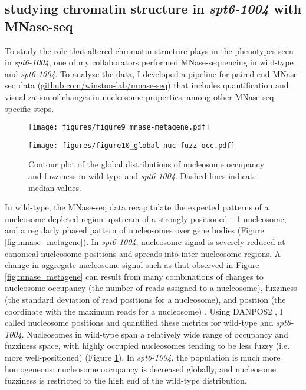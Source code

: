 \documentclass[9pt, letterpaper]{article}
\begin{document}
\subsection{studying chromatin structure in \textit{spt6-1004} with MNase-seq}

To study the role that altered chromatin structure plays in the phenotypes seen in \textit{spt6-1004}, one of my collaborators performed MNase-sequencing in wild-type and \textit{spt6-1004}. To analyze the data, I developed a pipeline for paired-end MNase-seq data (\href{https://github.com/winston-lab/mnase-seq}{github.com/winston-lab/mnase-seq}) that includes quantification and visualization of changes in nucleosome properties, among other MNase-seq specific steps.

\begin{figure}[H]
    \centering
    \begin{minipage}[t]{8.5cm}
        \centering
        \texttt{[image: figures/figure9\_mnase-metagene.pdf]}
        \caption{Average MNase-seq dyad signal in wild-type and \textit{spt6-1004}, over 3522 non-overlapping genes aligned by wild-type +1 nucleosome dyad. Values are the mean of spike-in normalized coverage in non-overlapping 20 bp bins, averaged over two replicates (\textit{spt6-1004}) or one experiment (wild-type). The solid line and shading are the median and the inter-quartile range.}
        \label{fig:mnase_metagene}
    \end{minipage}\hfill
    \begin{minipage}[t]{8.5cm}
        \centering
        \texttt{[image: figures/figure10\_global-nuc-fuzz-occ.pdf]}
        \caption{Contour plot of the global distributions of nucleosome occupancy and fuzziness in wild-type and \textit{spt6-1004}. Dashed lines indicate median values.}
        \label{fig:global_nuc_fuzz}
    \end{minipage}
\end{figure}

In wild-type, the MNase-seq data recapitulate the expected patterns of a nucleosome depleted region upstream of a strongly positioned +1 nucleosome, and a regularly phased pattern of nucleosomes over gene bodies (Figure \ref{fig:mnase_metagene}). In \textit{spt6-1004}, nucleosome signal is severely reduced at canonical nucleosome positions and spreads into inter-nucleosome regions. A change in aggregate nucleosome signal such as that observed in Figure \ref{fig:mnase_metagene} can result from many combinations of changes to nucleosome occupancy (the number of reads assigned to a nucleosome), fuzziness (the standard deviation of read positions for a nucleosome), and position (the coordinate with the maximum reads for a nucleosome) \cite{chen2013}. Using DANPOS2 \cite{chen2013}, I called nucleosome positions and quantified these metrics for wild-type and \textit{spt6-1004}. Nucleosomes in wild-type span a relatively wide range of occupancy and fuzziness space, with highly occupied nucleosomes tending to be less fuzzy (i.e. more well-positioned) (Figure \ref{fig:global_nuc_fuzz}). In \textit{spt6-1004}, the population is much more homogeneous: nucleosome occupancy is decreased globally, and nucleosome fuzziness is restricted to the high end of the wild-type distribution.
\end{document}
